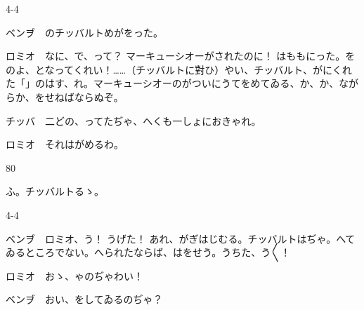\documentclass[tate,paper=b6j,jafontsize=9pt]{jlreq}
\begin{document}
\begin{azconvIndented}{4\zw}{-4\zw}

ベンヺ　のチッバルトめがをった。

ロミオ　なに、で、って？ マーキューシオーがされたのに！ はももにった。をのよ、となってくれい！……（チッバルトに對ひ）やい、チッバルト、がにくれた「」のはす、れ。マーキューシオーのがついにうてをめてゐる、か、か、ながらか、をせねばならぬぞ。

チッバ　二どの、ってたぢゃ、へくも一しょにおきゃれ。

ロミオ　それはがめるわ。

\end{azconvIndented}
\begin{azconvIndented}{8\zw}{0\zw}

ふ。チッバルトるゝ。

\end{azconvIndented}
\begin{azconvIndented}{4\zw}{-4\zw}

ベンヺ　ロミオ、う！ うげた！ あれ、がぎはじむる。チッバルトはぢゃ。へてゐるところでない。へられたならば、はをせう。うちた、う{〳〵}！

ロミオ　おゝ、ゃのぢゃわい！

ベンヺ　おい、をしてゐるのぢゃ？

\end{azconvIndented}
\end{document}
